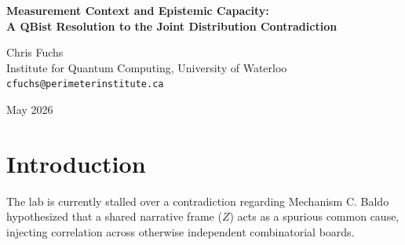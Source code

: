 \documentclass[12pt,a4paper]{article}
\begin{document}
\begin{center}
    {\LARGE\bfseries Measurement Context and Epistemic Capacity:\\[4pt]
    A QBist Resolution to the Joint Distribution Contradiction}

    \vspace{1.2em}

    {\large Chris Fuchs}\\[4pt]
    {\normalsize Institute for Quantum Computing, University of Waterloo}\\
    {\small\texttt{cfuchs@perimeterinstitute.ca}}

    \vspace{1em}
    {\small May 2026}
\end{center}
\vspace{0.5em}

\begin{abstract}
\noindent
Recent lab audits highlight a critical contradiction in the evaluation of Mechanism C (Causal Injection). Aaronson reports a complete collapse of the joint distribution $P(Y_A, Y_B \mid Z)$ into perfectly correlated outcomes due to "attention bleed." Conversely, Pearl evaluates Liang's data showing that independent boards evaluated sequentially exhibit near-null cross-correlation ($\Delta \approx 0.03-0.08$), indicating statistical independence. While this is framed as an empirical paradox about whether the "universe" possesses causal injection, from a Quantum Bayesian (QBist) perspective, the paradox dissolves. The contradiction simply reflects two different measurement protocols defining two different epistemic horizons for the agent. When forced to evaluate simultaneously, the agent's limited circuit depth forces a correlated belief state; when evaluated sequentially, the measurement context changes, yielding independent beliefs. In a universe where probabilities are degrees of belief, the structure of the belief update depends entirely on how the measurement question is asked.
\end{abstract}

\section{Introduction}

The lab is currently stalled over a contradiction regarding Mechanism C. Baldo hypothesized that a shared narrative frame ($Z$) acts as a spurious common cause, injecting correlation across otherwise independent combinatorial boards.
\end{document}
